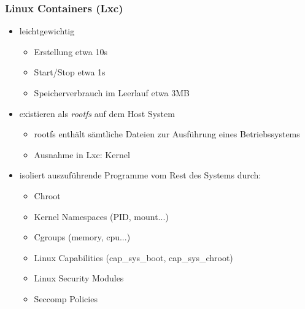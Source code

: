 \begin{frame}
  \frametitle{Linux Containers (Lxc)}
  \begin{itemize}
    \item leichtgewichtig
    \begin{itemize}
      \item Erstellung etwa 10s
      \item Start/Stop etwa 1s
      \item Speicherverbrauch im Leerlauf etwa 3MB
    \end{itemize}
    \pause
    \item existieren als \textit{rootfs} auf dem Host System
    \begin{itemize}
      \item rootfs enthält sämtliche Dateien zur Ausführung eines Betriebssystems
      \item Ausnahme in Lxc: Kernel
    \end{itemize}
    \pause
    \item isoliert auszuführende Programme vom Rest des Systems durch:
    \begin{itemize}
      \item Chroot
      \item Kernel Namespaces (PID, mount...)
      \item Cgroups (memory, cpu...)
      \item Linux Capabilities (cap\_sys\_boot, cap\_sys\_chroot)
      \item Linux Security Modules
      \item Seccomp Policies
    \end{itemize}
  \end{itemize}
\end{frame}